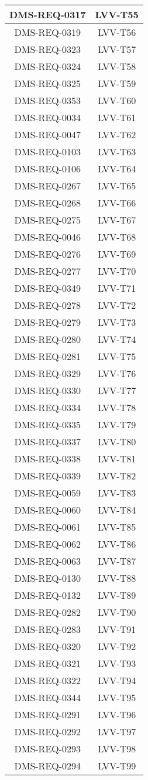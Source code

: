 \begin{longtable}{|c|c|}
DMS-REQ-0317 & LVV-T55\\\hline
DMS-REQ-0319 & LVV-T56\\\hline
DMS-REQ-0323 & LVV-T57\\\hline
DMS-REQ-0324 & LVV-T58\\\hline
DMS-REQ-0325 & LVV-T59\\\hline
DMS-REQ-0353 & LVV-T60\\\hline
DMS-REQ-0034 & LVV-T61\\\hline
DMS-REQ-0047 & LVV-T62\\\hline
DMS-REQ-0103 & LVV-T63\\\hline
DMS-REQ-0106 & LVV-T64\\\hline
DMS-REQ-0267 & LVV-T65\\\hline
DMS-REQ-0268 & LVV-T66\\\hline
DMS-REQ-0275 & LVV-T67\\\hline
DMS-REQ-0046 & LVV-T68\\\hline
DMS-REQ-0276 & LVV-T69\\\hline
DMS-REQ-0277 & LVV-T70\\\hline
DMS-REQ-0349 & LVV-T71\\\hline
DMS-REQ-0278 & LVV-T72\\\hline
DMS-REQ-0279 & LVV-T73\\\hline
DMS-REQ-0280 & LVV-T74\\\hline
DMS-REQ-0281 & LVV-T75\\\hline
DMS-REQ-0329 & LVV-T76\\\hline
DMS-REQ-0330 & LVV-T77\\\hline
DMS-REQ-0334 & LVV-T78\\\hline
DMS-REQ-0335 & LVV-T79\\\hline
DMS-REQ-0337 & LVV-T80\\\hline
DMS-REQ-0338 & LVV-T81\\\hline
DMS-REQ-0339 & LVV-T82\\\hline
DMS-REQ-0059 & LVV-T83\\\hline
DMS-REQ-0060 & LVV-T84\\\hline
DMS-REQ-0061 & LVV-T85\\\hline
DMS-REQ-0062 & LVV-T86\\\hline
DMS-REQ-0063 & LVV-T87\\\hline
DMS-REQ-0130 & LVV-T88\\\hline
DMS-REQ-0132 & LVV-T89\\\hline
DMS-REQ-0282 & LVV-T90\\\hline
DMS-REQ-0283 & LVV-T91\\\hline
DMS-REQ-0320 & LVV-T92\\\hline
DMS-REQ-0321 & LVV-T93\\\hline
DMS-REQ-0322 & LVV-T94\\\hline
DMS-REQ-0344 & LVV-T95\\\hline
DMS-REQ-0291 & LVV-T96\\\hline
DMS-REQ-0292 & LVV-T97\\\hline
DMS-REQ-0293 & LVV-T98\\\hline
DMS-REQ-0294 & LVV-T99\\\hline
\end{longtable}
